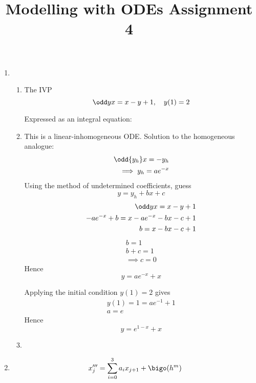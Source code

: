 \documentclass{X:/Documents/Coding/Latex/myassignment}
\title{Modelling with ODEs Assignment 4}
\begin{document}
\maketitle
\begin{enumerate}
	\item 

	\begin{enumerate}
		\item The IVP
		\[\odd yx = x -y +1, \quad y(1) = 2\]

		Expressed as an integral equation:


		
		\item This is a linear-inhomogeneous ODE. Solution to the homogeneous analogue:
		\begin{align*}
			\odd{y_h}x = -y_h\\
			\implies y_h = ae^{-x}
		\end{align*}
		Using the method of undetermined coefficients, guess 
		\[y = y_h + bx + c\]
		\begin{align*}
			\odd yx = x -y +1\\
			-ae^{-x} + b = x - ae^{-x} - bx - c + 1\\
			b = x - bx - c + 1\\
		\end{align*}
		\begin{align*}
			b = 1\\
			b+c = 1\\
			\implies c=0
		\end{align*}
		Hence
		\[y = ae^{-x} +x\]

		Applying the initial condition $y(1) =2 $ gives
		\begin{align*}
			y(1) = 1 = ae^{-1} + 1\\
			a = e
		\end{align*}
		Hence
		\[y = e^{1-x} + x\]

		
		\item %
	\end{enumerate}
	\item 
	\[x'''_j = \sum_{i=0}^3 a_i x_{j+1} + \bigo(h^m)\]


\end{enumerate}
\end{document}
